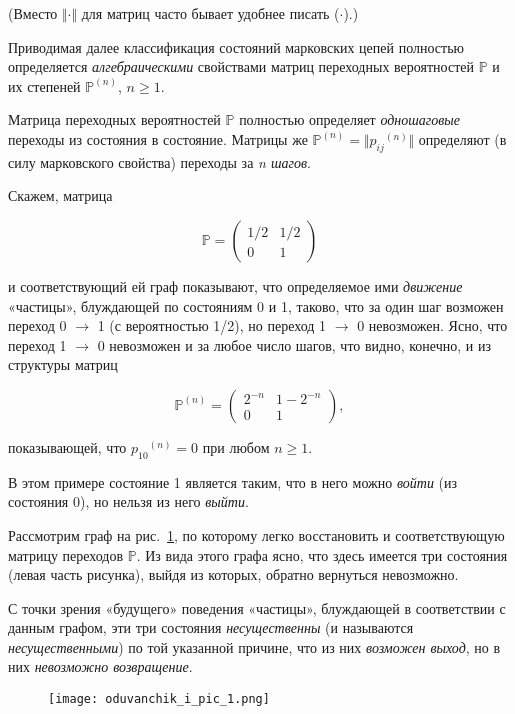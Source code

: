 (Вместо $\Vert \cdot \Vert$ для матриц часто бывает удобнее писать ($\cdot$).)

Приводимая далее классификация состояний марковских цепей полностью определяется \emph{алгебраическими} свойствами матриц переходных вероятностей $\mathbb{P}$ и их степеней $\mathbb{P}^{(n)}$, $n \geq 1$.

Матрица переходных вероятностей $\mathbb{P}$ полностью определяет \emph{одношаговые} переходы из состояния в состояние. Матрицы же $\mathbb{P}^{(n)} = \Vert {p_{ij}}^{(n)} \Vert$ определяют (в силу марковского свойства) переходы за \emph{n шагов}.

Скажем, матрица

\[ \mathbb{P} = \begin{pmatrix}
  1/2& 1/2\\
  0& 1
\end{pmatrix}\]

и соответствующий ей граф показывают, что определяемое
ими \emph{движение} «частицы», блуждающей по состояниям 0 и 1, таково, что
за один шаг возможен переход 0 $\rightarrow$ 1 (с вероятностью 1/2), но переход 1 $\rightarrow$ 0 невозможен. Ясно, что переход 1 $\rightarrow$ 0 невозможен и за любое число шагов, что видно, конечно, и из структуры матриц

\[ \mathbb{P}^{(n)} = \begin{pmatrix}
  2^{-n} & 1 - 2^{-n}\\
  0& 1
\end{pmatrix}, \]

показывающей, что ${p_{10}}^{(n)} = 0$ при любом $n \geq 1$.

В этом примере состояние 1 является таким, что в него можно \emph{войти} (из состояния 0), но нельзя из него \emph{выйти}.

Рассмотрим граф на рис.~\ref{fig::oduvan_pic_1}, по которому легко восстановить и соответствующую матрицу переходов $\mathbb{P}$. Из вида этого графа ясно, что здесь
имеется три состояния (левая часть рисунка), выйдя из которых, обратно
вернуться невозможно.

С точки зрения «будущего» поведения «частицы», блуждающей в соответствии с данным графом, эти три состояния \emph{несущественны} (и называются \emph{несущественными}) по той указанной причине, что из них \emph{возможен
выход}, но в них \emph{невозможно возвращение}.

\begin{figure}[h!]
			\centering
			\texttt{[image: oduvanchik\_i\_pic\_1.png]}
			\caption{~}
			\label{fig::oduvan_pic_1}
\end{figure}

